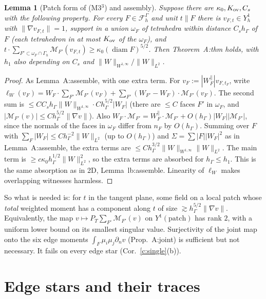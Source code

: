 \documentclass[11pt]{article}
\newtheorem{lemma}[theorem]{Lemma}
\theoremstyle{definition}
\newcommand{\hG}{h_\Gamma}
\newcommand{\Gh}{\Gamma_h}
\newcommand{\FG}{\mathcal F_h^\Gamma}
\newcommand{\M}{\mathcal M}
\newcommand{\norm}[1]{\lVert #1\rVert}
\DeclareMathOperator{\diam}{diam}
\begin{document}
\begin{lemma}[Patch form of (M3$^3$) and assembly]\label{l:patchM3}
Suppose there are $\kappa_0,K_{\rm ov},C_s$ with the following property. For every $F\in\FG$ and unit $t\parallel F$ there is $v_{F,t}\in Y_h^1$ with $\norm{\nabla v_{F,t}}=1$, support in a union $\omega_F$ of tetrahedra within distance $C_s\hG$ of $F$ (each tetrahedron in at most $K_{\rm ov}$ of the $\omega_F$), and $t\cdot\sum_{F'\subset\omega_F\cap\Gh}\M_{F'}(v_{F,t})\ge\kappa_0(\diam F)^{5/2}$. Then Theorem~A:thm holds, with $h_1$ also depending on $C_s$ and $\norm W_{W^{1,\infty}}/\norm W_{L^2}$.
\end{lemma}
\begin{proof}
As Lemma~A:assemble, with one extra term. For $v_F:=|W_F^\parallel|v_{F,t_F}$, write $\ell_W(v_F)=W_F\cdot\sum_{F'}\M_{F'}(v_F)+\sum_{F'}(W_{F'}-W_F)\cdot\M_{F'}(v_F)$. The second sum is $\le C C_s\hG\norm W_{W^{1,\infty}}\cdot C\hG^{5/2}|W_F|$ (there are $\le C$ faces $F'$ in $\omega_F$, and $|\M_{F'}(v)|\le C\hG^{5/2}\norm{\nabla v}$). Also $W_F\cdot\M_{F'}=W_F^{\parallel}\cdot\M_{F'}+O(\hG)|W_F||\M_{F'}|$, since the normals of the faces in $\omega_F$ differ from $n_F$ by $O(\hG)$. Summing over $F$ with $\sum_F|W_F|\le C\hG^{-2}\norm W_{L^2}$ (up to $O(\hG)$) and $\Sigma=\sum|F||W_F|^2$ as in Lemma~A:assemble, the extra terms are $\le C\hG^{3/2}\norm W_{W^{1,\infty}}\norm W_{L^2}$. The main term is $\ge c\kappa_0\hG^{1/2}\norm W_{L^2}^2$, so the extra terms are absorbed for $\hG\le h_1$. This is the same absorption as in 2D, Lemma~lb:assemble. Linearity of $\ell_W$ makes overlapping witnesses harmless.
\end{proof}

So what is needed is: for $t$ in the tangent plane, some field on a local patch whose \emph{total} weighted moment has a component along $t$ of size $\gtrsim\hG^{5/2}\norm{\nabla v}$. Equivalently, the map $v\mapsto P_T\sum_{F'}\M_{F'}(v)$ on $Y^1(\text{patch})$ has rank $2$, with a uniform lower bound on its smallest singular value. Surjectivity of the joint map onto the six edge moments $\int_F\mu_i\mu_j\partial_nv$ (Prop.~A:joint) is sufficient but not necessary. It fails on every edge star (Cor.~\ref{c:single}(b)).

\section{Edge stars and their traces}\label{s:trace}
\end{document}
